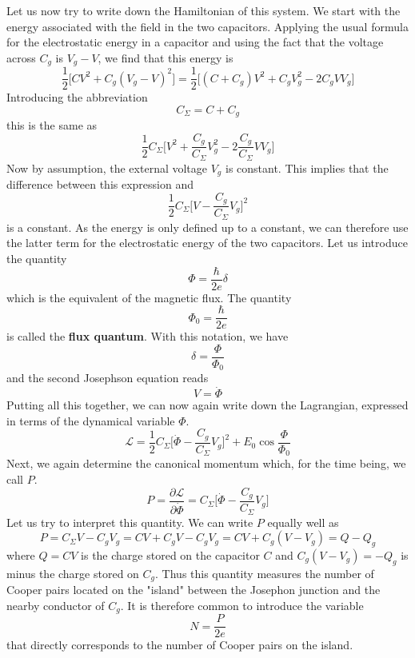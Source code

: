 \documentclass[a4paper, draft]{article}
\theoremstyle{own}
\theoremstyle{remark}
\begin{document}
Let us now try to write down the Hamiltonian of this system. We start with the energy associated with the field in the two capacitors. Applying the usual formula for the electrostatic energy in a capacitor and using the fact that the voltage across $C_g$ is $V_g - V$, we find that this energy is
$$
\frac{1}{2} \big[ CV^2 + C_g(V_g - V)^2 \big]
=
\frac{1}{2}  \big[ (C+C_g)V^2 + C_g V_g^2 - 2 C_g V V_g \big] 
$$
Introducing the abbreviation
$$
C_\Sigma = C + C_g
$$
this is the same as
$$
\frac{1}{2} C_\Sigma \big[ V^2 + \frac{C_g}{C_\Sigma} V_g^2 - 2 \frac{C_g}{C_\Sigma} V V_g \big] 
$$
Now by assumption, the external voltage $V_g$ is constant. This implies that the difference between this expression and
$$
\frac{1}{2} C_\Sigma \big[ V - \frac{C_g}{C_\Sigma} V_g \big]^2 
$$
is a constant. As the energy is only defined up to a constant, we can therefore use the latter term for the electrostatic energy of the two capacitors. Let us introduce the quantity
$$
\Phi = \frac{\hbar}{2e} \delta
$$
which is the equivalent of the magnetic flux. The quantity
$$
\Phi_0 = \frac{\hbar}{2e}
$$
is called the {\bf flux quantum}. With this notation, we have
$$
\delta = \frac{\Phi}{\Phi_0}
$$
and the second Josephson equation reads
$$
V = \dot{\Phi}
$$
Putting all this together, we can now again write down the Lagrangian, expressed in terms of the dynamical variable $\Phi$.
$$
{\mathcal L}  = \frac{1}{2} C_\Sigma \big[ \dot{\Phi} - \frac{C_g}{C_\Sigma} V_g \big]^2 + E_0 \cos \frac{\Phi}{\Phi_0}
$$
Next, we again determine the canonical momentum which, for the time being, we call $P$. 
$$
P = \frac{\partial {\mathcal L}}{\partial \dot{\Phi}} 
= 
C_\Sigma \big[ \dot{\Phi} - \frac{C_g}{C_\Sigma} V_g \big]
$$
Let us try to interpret this quantity. We can write $P$ equally well as
$$
P = C_\Sigma V - C_g V_g = CV + C_g V - C_g V_g = CV + C_g(V-V_g)
= Q - Q_g
$$
where $Q = CV$ is the charge stored on the capacitor $C$ and $C_g(V-V_g) = - Q_g$ is minus the charge stored on $C_g$. Thus this quantity measures the number of Cooper pairs located on the "island" between the Josephon junction and the nearby conductor of $C_g$. It is therefore common to introduce the variable
$$
N = \frac{P}{2e}
$$
that directly corresponds to the number of Cooper pairs on the island. 
\end{document}
